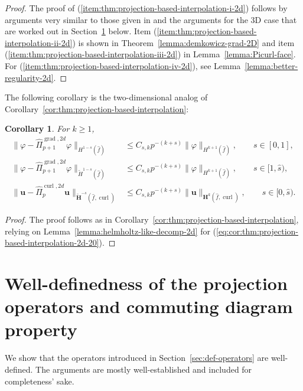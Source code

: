 \documentclass{article}
\newtheorem{corollary}[theorem]{Corollary}
\newcommand{\hatPicurlcomtwod}{\widehat \Pi^{\operatorname*{curl},2d}_p}
\newcommand{\hatPigradcomtwod}{\widehat\Pi^{\operatorname*{grad},2d}_{p+1}}
\begin{document}
\begin{proof}
The proof of (\ref{item:thm:projection-based-interpolation-i-2d}) follows by arguments
very similar to those given in \cite{demkowicz08} and the arguments 
for the 3D case that are  worked out in Section~\ref{sec:commuting} below. 
Item 
(\ref{item:thm:projection-based-interpolation-ii-2d})
is shown in Theorem~\ref{lemma:demkowicz-grad-2D} and item 
(\ref{item:thm:projection-based-interpolation-iii-2d}) 
in Lemma~\ref{lemma:Picurl-face}. 
For 
(\ref{item:thm:projection-based-interpolation-iv-2d}), see
Lemma~\ref{lemma:better-regularity-2d}.
\end{proof}

The following corollary is the two-dimensional analog of 
Corollary~\ref{cor:thm:projection-based-interpolation}:  
\begin{corollary}
\label{cor:thm:projection-based-interpolation-2d}  
For $k \ge 1$,
\begin{align}
\label{eq:cor:thm:projection-based-interpolation-2d-10}  
\|\varphi - \hatPigradcomtwod \varphi\|_{H^{1-s}(\widehat f)} &\leq C_{s,k} p^{-(k+s)}\|\varphi\|_{H^{k+1}(\widehat f)}, \qquad s\in [0,1],\\
\label{eq:cor:thm:projection-based-interpolation-2d-12}  
\|\varphi - \hatPigradcomtwod \varphi\|_{\widetilde H^{1-s}(\widehat f)} &\leq C_{s,k} p^{-(k+s)}\|\varphi\|_{H^{k+1}(\widehat f)}, \qquad s\in [1,\widehat{s}),\\
\label{eq:cor:thm:projection-based-interpolation-2d-20}  
\|{\mathbf u} - \hatPicurlcomtwod {\mathbf u}\|_{\widetilde{\mathbf H}^{-s}(\widehat f,\operatorname{curl})} 
&\leq C_{s,k} p^{-(k+s)}\|{\mathbf u}\|_{{\mathbf H}^{k}(\widehat f,\operatorname{curl})}, \qquad s\in [0,\widehat{s}).
\end{align}
\end{corollary}
\begin{proof}
The proof follows as in 
Corollary~\ref{cor:thm:projection-based-interpolation}, 
relying on Lemma~\ref{lemma:helmholtz-like-decomp-2d}
for %
(\ref{eq:cor:thm:projection-based-interpolation-2d-20}). 
\end{proof}


\section{Well-definedness of the projection operators and commuting diagram property}
\label{sec:commuting}
We show that the operators introduced in 
Section~\ref{sec:def-operators} are well-defined. The arguments are mostly
well-established and included for completeness' sake.
\end{document}
